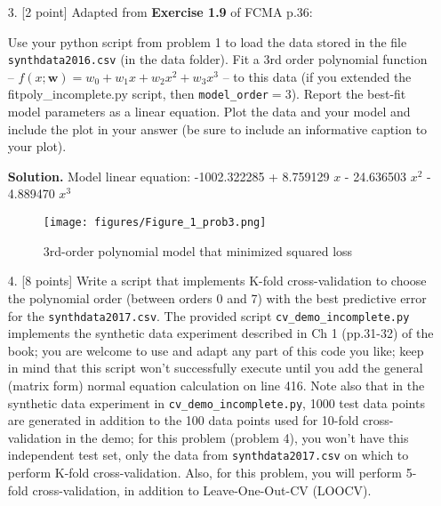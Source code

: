 \documentclass[10pt]{article}
\begin{document}
\begin{itemize}
{\bf Solution.} 
\begin{figure}[htb]
\begin{center}
\texttt{[image: figures/Figure\_1\_prob2.png]}
\caption{1st-order polynomial model that minimized squared loss}
\end{center}
\end{figure}
Model linear equation: 40.924155 - 0.015072 $x$


\item[3.] [2 point]
Adapted from {\bf Exercise 1.9} of FCMA p.36:

Use your python script from problem 1 to load the data stored in the file {\tt synthdata2016.csv} (in the data folder).  Fit a 3rd order polynomial function -- $f(x; \mathbf{w}) = w_0 + w_1 x + w_2 x^2 + w_3 x^3$ -- to this data (if you extended the {fitpoly\_incomplete.py} script, then {\tt model\_order}$ = 3$).  
Report the best-fit model parameters as a linear equation.  Plot the data and your model and include the plot in your answer (be sure to include an informative caption to your plot).

{\bf Solution.} Model linear equation: -1002.322285 + 8.759129 $x$ - 24.636503 $x^2$ - 4.889470 $x^3$
\begin{figure}[htb]
\begin{center}
\texttt{[image: figures/Figure\_1\_prob3.png]}
\caption{3rd-order polynomial model that minimized squared loss}
\end{center}
\end{figure}



\item[4.] [8 points]
Write a script that implements K-fold cross-validation to choose the polynomial order (between orders 0 and 7) with the best predictive error for the {\tt synthdata2017.csv}.  The provided script {\tt cv\_demo\_incomplete.py} implements the synthetic data experiment described in Ch 1 (pp.31-32) of the book; you are welcome to use and adapt any part of this code you like; keep in mind that this script won't successfully execute until you add the general (matrix form) normal equation calculation on line 416.
Note also that in the synthetic data experiment in {\tt cv\_demo\_incomplete.py}, 1000 test data points are generated in addition to the 100 data points used for 10-fold cross-validation in the demo; for this problem (problem 4), you won't have this independent test set, only the data from {\tt synthdata2017.csv} on which to perform K-fold cross-validation.  Also, for this problem, you will perform 5-fold cross-validation, in addition to Leave-One-Out-CV (LOOCV).


\end{itemize}
\end{document}
